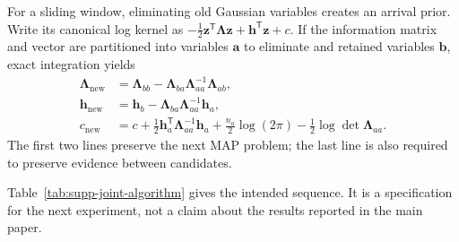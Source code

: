 

For a sliding window, eliminating old Gaussian variables creates an arrival prior. Write its canonical log kernel as
$-\tfrac12\bm z^{\mathsf T}\bm\Lambda\bm z+\bm h^{\mathsf T}\bm z+c$.
If the information matrix and vector are partitioned into variables $\bm a$ to eliminate and retained variables $\bm b$, exact integration yields
\begin{align}
 \bm\Lambda_{\mathrm{new}}
 &=\bm\Lambda_{bb}-\bm\Lambda_{ba}\bm\Lambda_{aa}^{-1}\bm\Lambda_{ab},\label{eq:supp-schur-precision}\\
 \bm h_{\mathrm{new}}
 &=\bm h_b-\bm\Lambda_{ba}\bm\Lambda_{aa}^{-1}\bm h_a,\label{eq:supp-schur-vector}\\
 c_{\mathrm{new}}
 &=c+\tfrac12\bm h_a^{\mathsf T}\bm\Lambda_{aa}^{-1}\bm h_a
 +\tfrac{n_a}{2}\log(2\pi)-\tfrac12\log\det\bm\Lambda_{aa}.
 \label{eq:supp-schur-normalizer}
\end{align}
The first two lines preserve the next MAP problem; the last line is also required to preserve evidence between candidates.

Table~\ref{tab:supp-joint-algorithm} gives the intended sequence. It is a specification for the next experiment, not a claim about the results reported in the main paper.

